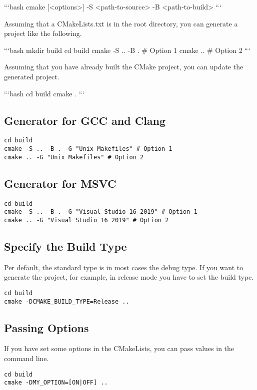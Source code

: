 ```bash
cmake [<options>] -S <path-to-source> -B <path-to-build>
```

Assuming that a CMakeLists.txt is in the root directory, you can generate a project like the following.

```bash
mkdir build
cd build
cmake -S .. -B . # Option 1
cmake .. # Option 2
```

Assuming that you have already built the CMake project, you can update the generated project.

```bash
cd build
cmake .
```

\subsection{Generator for GCC and Clang}

\begin{verbatim}
cd build
cmake -S .. -B . -G "Unix Makefiles" # Option 1
cmake .. -G "Unix Makefiles" # Option 2
\end{verbatim}


\subsection{Generator for MSVC}

\begin{verbatim}
cd build
cmake -S .. -B . -G "Visual Studio 16 2019" # Option 1
cmake .. -G "Visual Studio 16 2019" # Option 2
\end{verbatim}


\subsection{Specify the Build Type}


Per default, the standard type is in most cases the debug type.
If you want to generate the project, for example, in release mode you have to set the build type.

\begin{verbatim}
cd build
cmake -DCMAKE_BUILD_TYPE=Release ..
\end{verbatim}

\subsection{Passing Options}

If you have set some options in the CMakeLists, you can pass values in the command line.

\begin{verbatim}
cd build
cmake -DMY_OPTION=[ON|OFF] ..
\end{verbatim}


